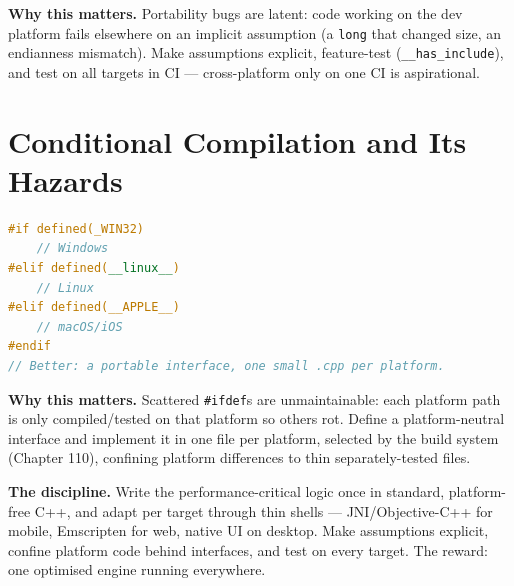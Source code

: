 \textbf{Why this matters.} Portability bugs are latent: code working on the dev platform fails elsewhere on an implicit assumption (a \texttt{long} that changed size, an endianness mismatch). Make assumptions explicit, feature-test (\texttt{\_\_has\_include}), and test on all targets in CI --- cross-platform only on one CI is aspirational.

\section{Conditional Compilation and Its Hazards}
\begin{lstlisting}[language=C++, caption={Isolate platform code behind an interface, not scattered #if. Min standard: C++17.}]
#if defined(_WIN32)
    // Windows
#elif defined(__linux__)
    // Linux
#elif defined(__APPLE__)
    // macOS/iOS
#endif
// Better: a portable interface, one small .cpp per platform.
\end{lstlisting}

\textbf{Why this matters.} Scattered \texttt{\#ifdef}s are unmaintainable: each platform path is only compiled/tested on that platform so others rot. Define a platform-neutral interface and implement it in one file per platform, selected by the build system (Chapter 110), confining platform differences to thin separately-tested files.

\textbf{The discipline.} Write the performance-critical logic once in standard, platform-free C++, and adapt per target through thin shells --- JNI/Objective-C++ for mobile, Emscripten for web, native UI on desktop. Make assumptions explicit, confine platform code behind interfaces, and test on every target. The reward: one optimised engine running everywhere.
